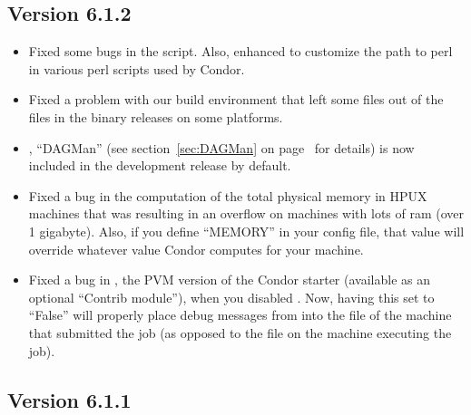 \subsection{\label{sec:New-6-1-2}Version 6.1.2}

\begin{itemize}

\item Fixed some bugs in the  script.
Also, enhanced  to customize the path to perl in
various perl scripts used by Condor.

\item Fixed a problem with our build environment that left some files
out of the  files in the binary releases on some
platforms. 

\item {}, ``DAGMan'' (see section~\ref{sec:DAGMan} on 
page~\pageref{sec:DAGMan} for details) is now included in the
development release by default.

\item Fixed a bug in the computation of the total physical memory in
HPUX machines that was resulting in an overflow on machines with
lots of ram (over 1 gigabyte).
Also, if you define ``MEMORY'' in your config file, that value will
override whatever value Condor computes for your machine.

\item Fixed a bug in , the PVM version of the
Condor starter (available as an optional ``Contrib module''), when you
disabled .
Now, having this set to ``False'' will properly place debug messages
from  into the  file of the
machine that submitted the job (as opposed to the 
file on the machine executing the job).  

\end{itemize}


\subsection{\label{sec:New-6-1-1}Version 6.1.1}

